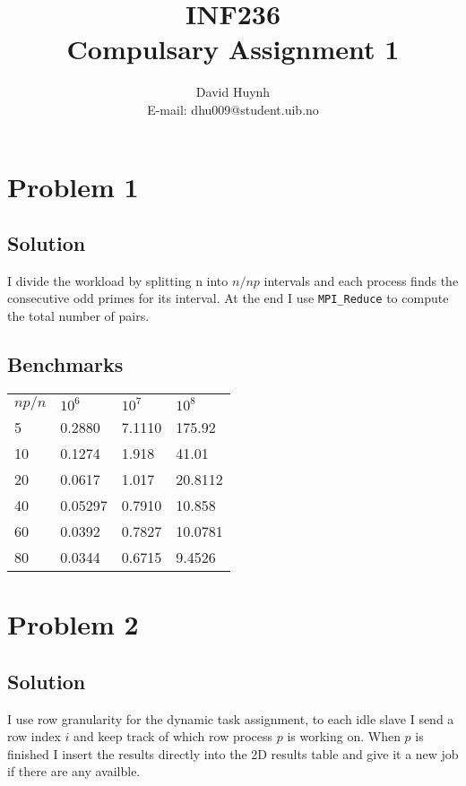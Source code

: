 \documentclass{article}
\begin{document}
\title{INF236\\ Compulsary Assignment 1}
\author{David Huynh\\ E-mail: dhu009@student.uib.no}
\date{}

\maketitle

\section*{Problem 1}

\subsection*{Solution}

I divide the workload by splitting n into $n/np$ intervals and each process finds the consecutive odd primes for its interval. At the end I use \verb|MPI_Reduce| to compute the total number of pairs.

\subsection*{Benchmarks}

\begin{table}[h]
\begin{tabular}{llll}
$np/n$ & $10^{6}$ & $10^{7}$ & $10^{8}$\\
5 & 0.2880 & 7.1110 & 175.92\\
10 & 0.1274 & 1.918 & 41.01\\
20 & 0.0617 & 1.017 & 20.8112\\
40 & 0.05297 & 0.7910 & 10.858\\
60 & 0.0392 & 0.7827 & 10.0781\\
80 & 0.0344  & 0.6715 & 9.4526
\end{tabular}
\end{table}

\section*{Problem 2}

\subsection*{Solution}

I use row granularity for the dynamic task assignment, to each idle slave I send a row index $i$ and keep track of which row process $p$ is working on. When $p$ is finished I insert the results directly into the 2D results table and give it a new job if there are any availble.
\end{document}
